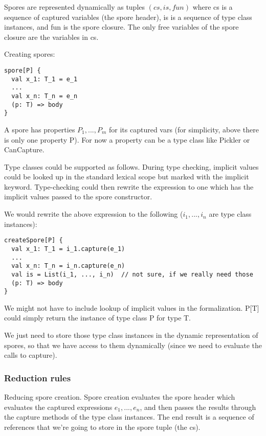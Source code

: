 \documentclass{llncs}
\begin{document}
Spores are represented dynamically as tuples $(cs, is, fun)$ where cs is a
sequence of captured variables (the spore header), is is a sequence of type
class instances, and fun is the spore closure. The only free variables of the
spore closure are the variables in cs.

Creating spores:

\begin{lstlisting}
spore[P] {
  val x_1: T_1 = e_1
  ...
  val x_n: T_n = e_n
  (p: T) => body
}
\end{lstlisting}

A spore has properties $P_1, ..., P_m$ for its captured vars (for simplicity,
above there is only one property P). For now a property can be a type class
like Pickler or CanCapture.

Type classes could be supported as follows. During type checking, implicit
values could be looked up in the standard lexical scope but marked with the
implicit keyword. Type-checking could then rewrite the expression to one which
has the implicit values passed to the spore constructor.

We would rewrite the above expression to the following ($i_1, ..., i_n$ are type
class instances):

\begin{lstlisting}
createSpore[P] {
  val x_1: T_1 = i_1.capture(e_1)
  ...
  val x_n: T_n = i_n.capture(e_n)
  val is = List(i_1, ..., i_n)  // not sure, if we really need those
  (p: T) => body
}
\end{lstlisting}

We might not have to include lookup of implicit values in the formalization.
P[T] could simply return the instance of type class P for type T.

We just need to store those type class instances in the dynamic representation
of spores, so that we have access to them dynamically (since we need to
evaluate the calls to capture).

\subsubsection{Reduction rules}

Reducing spore creation. Spore creation evaluates the spore header which
evaluates the captured expressions $e_1, ..., e_n$, and then passes the results
through the capture methods of the type class instances. The end result is a
sequence of references that we're going to store in the spore tuple (the cs).
\end{document}
